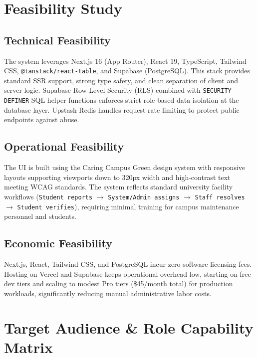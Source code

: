 \documentclass[12pt, a4paper]{article}
\begin{document}
\section{Feasibility Study}

\subsection{Technical Feasibility}
The system leverages Next.js 16 (App Router), React 19, TypeScript, Tailwind CSS, \texttt{@tanstack/react-table}, and Supabase (PostgreSQL). This stack provides standard SSR support, strong type safety, and clean separation of client and server logic. Supabase Row Level Security (RLS) combined with \texttt{SECURITY DEFINER} SQL helper functions enforces strict role-based data isolation at the database layer. Upstash Redis handles request rate limiting to protect public endpoints against abuse.

\subsection{Operational Feasibility}
The UI is built using the Caring Campus Green design system with responsive layouts supporting viewports down to 320px width and high-contrast text meeting WCAG standards. The system reflects standard university facility workflows (\texttt{Student reports} $\rightarrow$ \texttt{System/Admin assigns} $\rightarrow$ \texttt{Staff resolves} $\rightarrow$ \texttt{Student verifies}), requiring minimal training for campus maintenance personnel and students.

\subsection{Economic Feasibility}
Next.js, React, Tailwind CSS, and PostgreSQL incur zero software licensing fees. Hosting on Vercel and Supabase keeps operational overhead low, starting on free dev tiers and scaling to modest Pro tiers (\$45/month total) for production workloads, significantly reducing manual administrative labor costs.

\section{Target Audience \& Role Capability Matrix}
\end{document}
